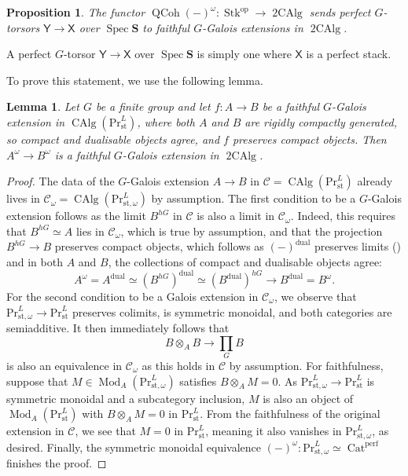 \documentclass[11pt, a4paper]{article}
\newcommand{\dualisable}{\mathrm{dual}}
\newcommand{\perf}{\mathrm{perf}}
\newcommand{\st}{\mathrm{st}}
\DeclareMathOperator{\Spec}{Spec}
\newcommand{\1}{\mathbf{1}}
\newcommand{\Sph}{\mathbf{S}}
\DeclareMathOperator{\CAlg}{CAlg}
\DeclareMathOperator{\tworing}{2CAlg}
\DeclareMathOperator{\Cat}{Cat}
\newcommand{\PrLst}{{\mathrm{Pr}^L_\st}}
\newcommand{\PrLstomega}{{\mathrm{Pr}^L_{\st,\omega}}}
\DeclareMathOperator{\Mod}{Mod}
\DeclareMathOperator{\QCoh}{QCoh}
\DeclareMathOperator{\Stk}{Stk}
\newcommand{\op}{\mathrm{op}}
\newcommand{\calC}{\mathcal{C}}
\newcommand{\X}{\mathsf{X}}
\newcommand{\Y}{\mathsf{Y}}
\theoremstyle{plain}
\newtheorem{prop}[equation]{Proposition}
\newtheorem{lemma}[equation]{Lemma}
\theoremstyle{definition}
\theoremstyle{remark}\numberwithin{equation}{section}
\begin{document}
\begin{prop}\label{pr:torsor_to_Galois_2ring}
    The functor $\QCoh(-)^\omega \colon \Stk^\op \to \tworing$ sends perfect $G$-torsors $\Y \to \X$ over $\Spec \Sph$ to faithful $G$-Galois extensions in $\tworing$.
\end{prop}

A perfect $G$-torsor $\Y \to \X$ over $\Spec \Sph$ is simply one where $\X$ is a perfect stack.

To prove this statement, we use the following lemma.

\begin{lemma}\label{lm:compactobjects_pres_galois}
    Let $G$ be a finite group and let $f\colon A \to B$ be a faithful $G$-Galois extension in $\CAlg(\PrLst)$, where both $A$ and $B$ are rigidly compactly generated, so compact and dualisable objects agree, and $f$ preserves compact objects. Then $A^\omega \to B^\omega$ is a faithful $G$-Galois extension in $\tworing$.
\end{lemma}

\begin{proof}
    The data of the $G$-Galois extension $A \to B$ in $\calC=\CAlg(\PrLst)$ already lives in $\calC_\omega = \CAlg(\PrLstomega)$ by assumption. The first condition to be a $G$-Galois extension follows as the limit $B^{hG}$ in $\calC$ is also a limit in $\calC_{\omega}$. Indeed, this requires that $B^{hG} \simeq A$ lies in $\calC_{\omega}$, which is true by assumption, and that the projection $B^{hG} \to B$ preserves compact objects, which follows as $(-)^\dualisable$ preserves limits (\cite[Pr.4.6.1.11]{ha}) and in both $A$ and $B$, the collections of compact and dualisable objects agree:
    \[A^\omega = A^\dualisable \simeq (B^{hG})^\dualisable \simeq (B^\dualisable)^{hG} \to B^\dualisable = B^\omega.\]
    For the second condition to be a Galois extension in $\calC_\omega$, we observe that $\PrLstomega \to \PrLst$ preserves colimits, is symmetric monoidal, and both categories are semiadditive. It then immediately follows that
    \[B\otimes_A B \to \prod_G B\]
    is also an equivalence in $\calC_\omega$ as this holds in $\calC$ by assumption. For faithfulness, suppose that $M \in \Mod_A(\PrLstomega)$ satisfies $B\otimes_A M = 0$. As $\PrLstomega \to \PrLst$ is symmetric monoidal and a subcategory inclusion, $M$ is also an object of $\Mod_A(\PrLst)$ with $B\otimes_A M=0$ in $\PrLst$. From the faithfulness of the original extension in $\calC$, we see that $M=0$ in $\PrLst$, meaning it also vanishes in $\PrLstomega$, as desired. Finally, the symmetric monoidal equivalence $(-)^\omega\colon \PrLstomega\simeq \Cat^\perf$ finishes the proof.
\end{proof}
\end{document}

